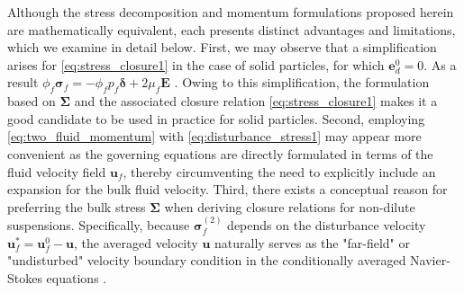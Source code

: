 Although the stress decomposition and momentum formulations proposed herein are mathematically equivalent, each presents distinct advantages and limitations, which we examine in detail below.
First, we may observe that a simplification arises for \ref{eq:stress_closure1} in the case of solid particles, for which $\textbf{e}_d^0 = 0$.
As a result $\phi _f \bm \sigma _f = - \phi _f p_f \bm\delta + 2 \mu_ f \textbf{E}$ \citep{joseph1990ensemble,jackson2000}. %
Owing to this simplification, the formulation based on $\bm\Sigma$ and the associated closure relation \eqref{eq:stress_closure1} makes it a good candidate to be used in practice for solid particles. %
Second, employing \ref{eq:two_fluid_momentum} with \ref{eq:disturbance_stress1} may appear more convenient as the governing equations are directly formulated in terms of the fluid velocity field $\textbf{u}_f$, thereby circumventing the need to explicitly include an expansion for the bulk fluid velocity. %
Third, there exists a conceptual reason for preferring the bulk stress $\bm\Sigma$ when deriving closure relations for non-dilute suspensions.  %
Specifically, because $\bm\sigma_f^{(2)}$ depends on the disturbance velocity $\textbf{u}_f^* = \textbf{u}_f^0 - \textbf{u}$, the averaged velocity $\textbf{u}$ naturally serves as the "far-field" or "undisturbed" velocity boundary condition in the conditionally averaged Navier-Stokes equations \citep{hinch1977averaged,fintzi2025}. %
